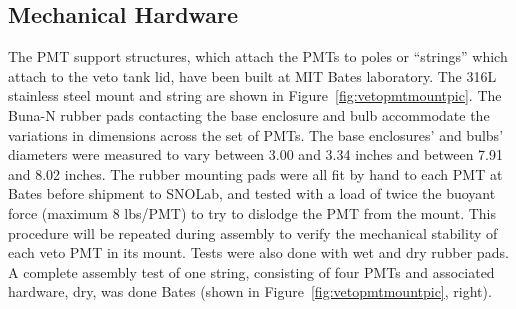 \documentclass{JINST}
\begin{document}
\subsection{Mechanical Hardware}
%
The PMT support structures, which attach the PMTs to poles or
``strings'' which attach to the veto tank lid, have been built at
MIT Bates laboratory. 
The 316L stainless steel mount and string are shown in
Figure~\ref{fig:vetopmtmountpic}.  The
Buna-N rubber pads contacting the base enclosure and bulb accommodate
the variations in dimensions across the set of PMTs. The base
enclosures' and bulbs' diameters were measured to vary between 3.00
and 3.34 inches and between 7.91 and 8.02 inches. The rubber mounting
pads were all fit by hand to each PMT at Bates before shipment to
SNOLab, and tested with a load of twice the buoyant force (maximum 8
lbs/PMT) to try to dislodge the PMT from the mount.  This procedure
will be repeated during assembly to verify the mechanical stability of
each veto PMT in its mount.  Tests were also done with wet and dry
rubber pads.  A complete assembly test of one string, consisting of
four PMTs and associated hardware, dry, was done Bates (shown in Figure~\ref{fig:vetopmtmountpic}, right).

%
\end{document}
